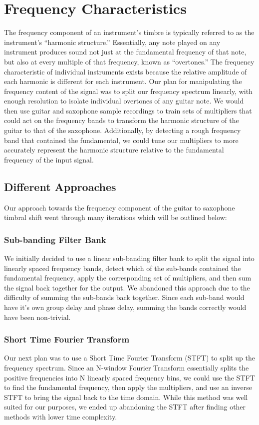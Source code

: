 \documentclass[twoside,a4paper]{article}
\begin{document}
\section{Frequency Characteristics}
The frequency component of an instrument's timbre is typically referred to as the instrument's
``harmonic structure.'' Essentially, any note played on any instrument produces sound not just at the 
fundamental frequency of that note, but also at every multiple of that frequency, known as ``overtones.''
The frequency characteristic of individual instruments exists because the relative amplitude of each harmonic is different for each instrument.
\newline\newline
Our plan for manipulating the frequency content of the signal was to split our frequency spectrum linearly, 
with enough resolution to isolate individual overtones of any guitar note. We would then use guitar and saxophone 
sample recordings to train sets of multipliers that could act on the frequency bands to transform the harmonic structure 
of the guitar to that of the saxophone. Additionally, by detecting a rough frequency band that contained the fundamental, 
we could tune our multipliers to more accurately represent the harmonic structure relative to the fundamental frequency of the input signal.

\subsection{Different Approaches}
Our approach towards the frequency component of the guitar to saxophone timbral shift went through many iterations which will be outlined below:

\subsubsection{Sub-banding Filter Bank}
We initially decided to use a linear sub-banding filter bank to split the signal
into linearly spaced frequency bands, detect which of the sub-bands contained the
fundamental frequency, apply the corresponding set of multipliers, and then sum
the signal back together for the output. We abandoned this approach due to the difficulty
of summing the sub-bands back together. Since each sub-band would have it's own group delay
and phase delay, summing the bands correctly would have been non-trivial.

\subsubsection{Short Time Fourier Transform}
Our next plan was to use a Short Time Fourier Transform (STFT) to split
up the frequency spectrum. Since an N-window Fourier Transform essentially splits
the positive frequencies into N linearly spaced frequency bins, we could use the STFT
to find the fundamental frequency, then apply the multipliers, and use an inverse STFT
to bring the signal back to the time domain. While this method was well
suited for our purposes, we ended up abandoning the STFT after finding other methods
with lower time complexity.
\end{document}
